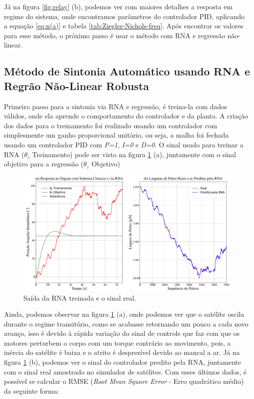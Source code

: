 Já na figura \ref{fig:relay} (b), podemos ver com maiores detalhes a resposta em regime do sistema, onde encontramos parâmetros do controlador PID, aplicando a equação \ref{eq:n(a)} e tabela \ref{tab:Ziegler-Nichols-freq}. Após encontrar os valores para esse método, o próximo passo é usar o método com RNA e regressão não-linear.



\subsection{Método de Sintonia Automático usando RNA e Regrão Não-Linear Robusta}

Primeiro passo para a sintonia via RNA e regressão, é treina-la com dados válidos, onde ela aprende o comportamento do controlador e da planta. A criação dos dados para o treinamento foi realizado usando um controlador com simplesmente um ganho proporcional unitário, ou seja, a malha foi fechada usando um controlador PID com \textit{P=1}, \textit{I=0} e \textit{D=0}. O sinal usado para treinar a RNA ($\theta_z$ Treinamento) pode ser visto na figura \ref{fig:neural_output} (a), juntamente com o sinal objetivo para a regressão ($\theta_z$ Objetivo)

\begin{figure}[H]
  \caption{Saída da RNA treinada e o sinal real.}
  \begin{center}
      \includegraphics[scale=0.34]{resultados/img/neural_output}
  \end{center}
  \label{fig:neural_output}
\end{figure}

Ainda, podemos observar na figura \ref{fig:neural_output} (a), onde podemos ver que o satélite oscila durante o regime transitório, como se acabasse retornando um pouco a cada novo avanço, isso é devido à rápida variação do sinal de controle que faz com que os motores perturbem o corpo com um torque contrário ao movimento, pois, a inércia do satélite é baixa e o atrito é desprezível devido ao mancal a ar. Já na figura \ref{fig:neural_output} (b), podemos ver o sinal do controlador predito pela RNA, juntamente com o sinal real amostrado no simulador de satélites. Com esses últimos dados, é possível se calcular o RMSE (\textit{Root Mean Square Error} - Erro quadrático médio) da seguinte forma:

